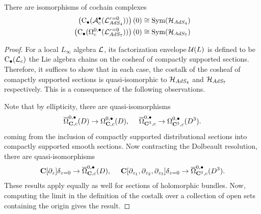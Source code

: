 \documentclass[../main.tex]{subfiles}
\begin{document}
\begin{prop}\label{prop:altstates}
There are isomorphisms of cochain complexes
\begin{align*}
 \left ( {\mathrm{C}}_\bullet(\mathcal A^\bullet_c (\mathcal{L}_{AdS_4}^{r=0} )) \right )(0) & \cong \text{Sym}( \mathcal{H}_{AdS_4} ) \\
\left ( {\mathrm{C}}_\bullet ( \Omega^{0,\bullet}_{c}(\mathcal{L}_{AdS_7}^{r=0})) \right )(0) & \cong \text{Sym}( \mathcal{H}_{AdS_7} )
\end{align*}
\end{prop}
\begin{proof}
For a local $L_\infty$ algebra $\mathcal{L}$, its factorization envelope $\mathcal{U}(L)$ is defined to be ${\mathrm{C}}_\bullet (\mathcal{L}_c)$ the Lie algebra chains on the cosheaf of compactly supported sections. Therefore, it suffices to show that in each case, the costalk of the cosheaf of comapctly supported sections is quasi-isomorphic to $\mathcal{H}_{AdS_4}$ and $\mathcal{H}_{AdS_7}$ respectively. This is a consequence of the following observations.

Note that by ellipticity, there are quasi-isomorphisms 
\[\overline \Omega^{0,\bullet}_{\mathbf{C},c} (D) \to \Omega^{0,\bullet}_{\mathbf{C},c} (D), \ \ \ \ \overline \Omega^{0,\bullet}_{\mathbf{C}^3,c} \to \Omega^{0,\bullet}_{\mathbf{C}^3,c} (D^3).\]
coming from the inclusion of compactly supported distributional sections into compactly supported smooth sections. Now contracting the Dolbeault resolution, there are quasi-isomorphisms
\[\mathbf{C}[\partial_z]\delta_{z=0} \to \overline \Omega^{0,\bullet}_{\mathbf{C},c} (D), \ \ \ \ \mathbf{C}[\partial_{z_1}, \partial_{z_2}, \partial_{z_3}]\delta_{z=0} \to \overline \Omega^{0,\bullet}_{\mathbf{C}^3,c} (D^3).\]
These results apply equally as well for sections of holomorphic bundles. Now, computing the limit in the definition of the costalk over a collection of open sets containing the origin gives the result.
\end{proof}
\end{document}
